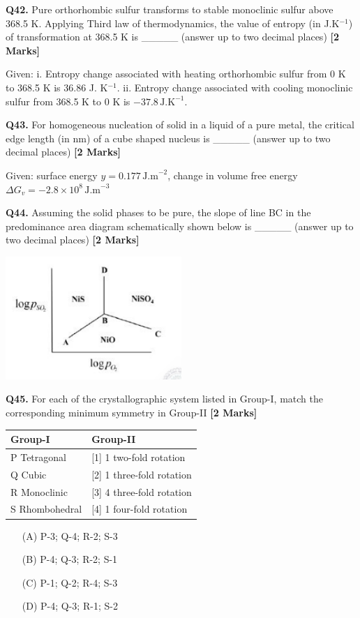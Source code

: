 \documentclass[11pt]{article}
\newcommand{\questionb}[2]{
    \noindent\textbf{Q#2.} #1 \hfill \textbf{[2 Marks]}
}
\begin{document}
\questionb{Pure orthorhombic sulfur transforms to stable monoclinic sulfur above 368.5 K. Applying Third law of thermodynamics, the value of entropy (in J.K\(^{-1}\)) of transformation at 368.5 K is \_\_\_\_\_ (answer up to two decimal places)}{42}
Given: i. Entropy change associated with heating orthorhombic sulfur from 0 K to 368.5 K is 36.86 J. K\(^{-1}\). ii. Entropy change associated with cooling monoclinic sulfur from 368.5 K to 0 K is \(-37.8 \, \text{J.K}^{-1}\).
\vspace{0.5cm}

\questionb{For homogeneous nucleation of solid in a liquid of a pure metal, the critical edge length (in nm) of a cube shaped nucleus is \_\_\_\_\_ (answer up to two decimal places)}{43}
Given: surface energy \(y = 0.177 \, \text{J.m}^{-2}\), change in volume free energy \(\Delta G_v = -2.8 \times 10^8 \, \text{J.m}^{-3}\)
\vspace{0.5cm}

\questionb{Assuming the solid phases to be pure, the slope of line BC in the predominance area diagram schematically shown below is \_\_\_\_\_ (answer up to two decimal places)}{44}
\begin{center}
\includegraphics[width=0.5\textwidth]{figures/44.png}
\end{center}
\vspace{0.5cm}

\questionb{For each of the crystallographic system listed in Group-I, match the corresponding minimum symmetry in Group-II}{45}
\begin{center}
\begin{tabular}{|l|l|}
\hline
\textbf{Group-I} & \textbf{Group-II} \\
\hline
P Tetragonal & [1] 1 two-fold rotation \\
Q Cubic & [2] 1 three-fold rotation \\
R Monoclinic & [3] 4 three-fold rotation \\
S Rhombohedral & [4] 1 four-fold rotation \\
\hline
\end{tabular}
\end{center}
\begin{enumerate}
    \item[(A)] P-3; Q-4; R-2; S-3
    \item[(B)] P-4; Q-3; R-2; S-1
    \item[(C)] P-1; Q-2; R-4; S-3
    \item[(D)] P-4; Q-3; R-1; S-2
\end{enumerate}
\vspace{0.5cm}
\end{document}
